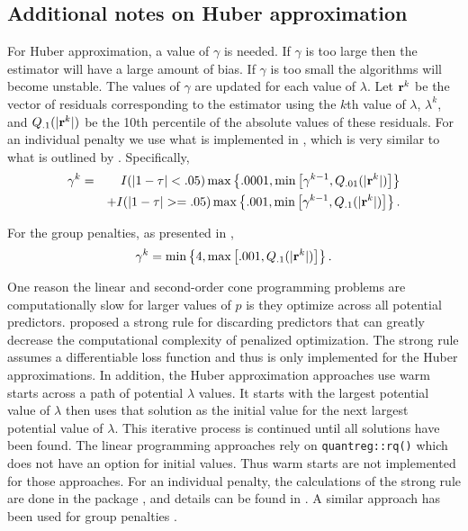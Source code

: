 \subsection{Additional notes on Huber approximation}\label{additional-notes-on-huber-approximation}

For Huber approximation, a value of \(\gamma\) is needed. If \(\gamma\) is too large then the estimator will have a large amount of bias. If \(\gamma\) is too small the algorithms will become unstable. The values of \(\gamma\) are updated for each value of \(\lambda\). Let \({\bf r}^k\) be the vector of residuals corresponding to the estimator using the \(k\)th value of \(\lambda\), \(\lambda^k\), and \(Q_{.1}(|{\bf r}^k|)\) be the 10th percentile of the absolute values of these residuals. For an individual penalty we use what is implemented in , which is very similar to what is outlined by \citet{huber_cd}. Specifically,
\begin{eqnarray*}
\gamma^k &=& I(|1-\tau|< .05)\max\left\{.0001,\min\left[\gamma^{k-1},Q_{.01}(|{\bf r}^k|)\right]\right\} \\
&& + I(|1-\tau|>=.05)\max\left\{.001,\min\left[\gamma^{k-1},Q_{.1}(|{\bf r}^k|)\right]\right\}.
\end{eqnarray*}

For the group penalties, as presented in \citet{SherwoodLi2022},
\begin{equation*}
\gamma^k = \min\left\{4, \max\left[.001, Q_{.1}(|{\bf r}^k|) \right] \right\}.
\end{equation*}

One reason the linear and second-order cone programming problems are computationally slow for larger values of \(p\) is they optimize across all potential predictors. \citet{tibshirani2012strong} proposed a strong rule for discarding predictors that can greatly decrease the computational complexity of penalized optimization. The strong rule assumes a differentiable loss function and thus is only implemented for the Huber approximations. In addition, the Huber approximation approaches use warm starts across a path of potential \(\lambda\) values. It starts with the largest potential value of \(\lambda\) then uses that solution as the initial value for the next largest potential value of \(\lambda\). This iterative process is continued until all solutions have been found. The linear programming approaches rely on \texttt{quantreg::rq()} which does not have an option for initial values. Thus warm starts are not implemented for those approaches. For an individual penalty, the calculations of the strong rule are done in the package , and details can be found in \citet{huber_cd}. A similar approach has been used for group penalties \citep{SherwoodLi2022}.

